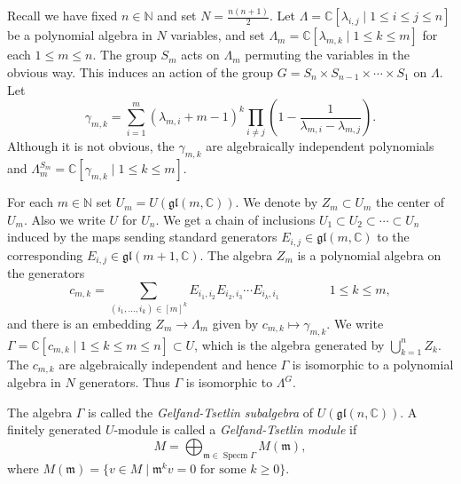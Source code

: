 \documentclass[11pt,fleqn]{article}
\newcommand\NN{\mathbb N}
\newcommand\CC{\mathbb C}
\renewcommand\to{\longrightarrow}
\newcommand\gl{\mathfrak{gl}}
\DeclareMathOperator\Specm{Specm}
\begin{document}
Recall we have fixed $n \in \NN$ and set $N = \frac{n(n+1)}{2}$. Let 
$\Lambda = \CC[\lambda_{i,j} \mid 1 \leq i \leq j \leq n]$ be a polynomial 
algebra in $N$ variables, and set $\Lambda_m = \CC[\lambda_{m,k} \mid 1 \leq k 
\leq m]$ for each $1 \leq m \leq n$. The group $S_m$ acts on $\Lambda_m$ 
permuting the variables in the obvious way. This induces an action of the 
group $G = S_n \times S_{n-1} \times \cdots \times S_1$ on $\Lambda$. Let
\[
	\gamma_{m,k} = \sum_{i = 1}^m (\lambda_{m,i}+m-1)^k 
	\prod_{i \neq j} \left( 1 - \frac{1}{\lambda_{m,i} - \lambda_{m,j}}\right).
\]
Although it is not obvious, the $\gamma_{m,k}$ are algebraically independent 
polynomials and $\Lambda_m^{S_m} = \CC[\gamma_{m,k} \mid 1 \leq k \leq m]$. 

For each $m \in \NN$ set $U_m = U(\gl(m, \CC))$. We denote by $Z_m \subset U_m$
the center of $U_m$. Also we write $U$ for $U_n$. We get a chain of inclusions 
$U_1 \subset U_2 \subset \cdots \subset U_n$ induced by the maps sending 
standard generators $E_{i,j} \in \gl(m,\CC)$ to the corresponding $E_{i,j} 
\in \gl(m+1, \CC)$. The algebra $Z_m$ is a polynomial algebra on the generators
\[
	c_{m,k} = \sum_{(i_1, \ldots, i_k) \in [m]^k} E_{i_1,i_2} E_{i_2,i_3} 
		\cdots E_{i_k, i_1} \qquad \qquad 1 \leq k \leq m,
\]
and there is an embedding $Z_m \to \Lambda_m$ given by $c_{m,k} \mapsto 
\gamma_{m,k}$. We write $\Gamma = \CC[c_{m,k} \mid 1 \leq k \leq m \leq n] 
\subset U$, which is the algebra generated by $\bigcup_{k=1}^n Z_k$. The 
$c_{m,k}$ are algebraically independent and hence $\Gamma$ is isomorphic to a 
polynomial algebra in $N$ generators. Thus $\Gamma$ is isomorphic to 
$\Lambda^G$.

\begin{Definition}
\label{D:gt-modules}
The algebra $\Gamma$ is called the \emph{Gelfand-Tsetlin subalgebra} of 
$U(\gl(n,\CC))$. A finitely generated $U$-module is called a 
\emph{Gelfand-Tsetlin module} if
\[
	M = \bigoplus_{\mathfrak m \in \Specm \Gamma} M (\mathfrak m),
\] 
where $M(\mathfrak m) = \{v \in M \mid \mathfrak m^k v = 0 \mbox{ for some } k 
\geq 0\}$.
\end{Definition}
\end{document}
